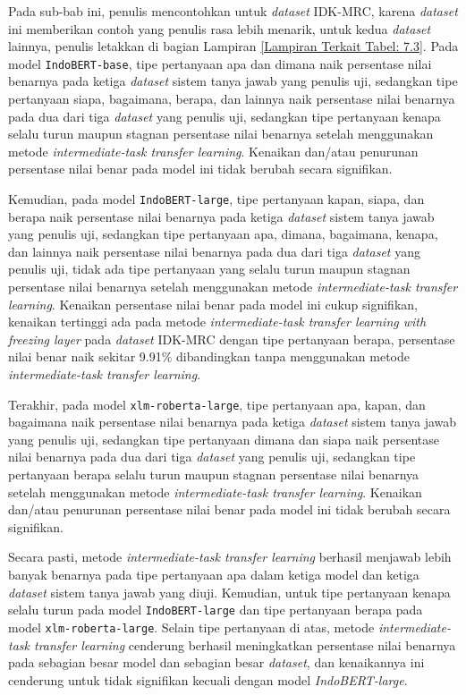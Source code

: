 Pada sub-bab ini, penulis mencontohkan untuk \emph{dataset} IDK-MRC, karena \emph{dataset} ini memberikan contoh yang penulis rasa lebih menarik, untuk kedua \emph{dataset} lainnya, penulis letakkan di bagian Lampiran \ref{Lampiran Terkait Tabel: 7.3}. Pada model \texttt{IndoBERT-base}, tipe pertanyaan apa dan dimana naik persentase nilai benarnya pada ketiga \emph{dataset} sistem tanya jawab yang penulis uji, sedangkan tipe pertanyaan siapa, bagaimana, berapa, dan lainnya naik persentase nilai benarnya pada dua dari tiga \emph{dataset} yang penulis uji, sedangkan tipe pertanyaan kenapa selalu turun maupun stagnan persentase nilai benarnya setelah menggunakan metode \emph{intermediate-task transfer learning}. Kenaikan dan/atau penurunan persentase nilai benar pada model ini tidak berubah secara signifikan.

Kemudian, pada model \texttt{IndoBERT-large}, tipe pertanyaan kapan, siapa, dan berapa naik persentase nilai benarnya pada ketiga \emph{dataset} sistem tanya jawab yang penulis uji, sedangkan tipe pertanyaan apa, dimana, bagaimana, kenapa, dan lainnya naik persentase nilai benarnya pada dua dari tiga \emph{dataset} yang penulis uji, tidak ada tipe pertanyaan yang selalu turun maupun stagnan persentase nilai benarnya setelah menggunakan metode \emph{intermediate-task transfer learning}. Kenaikan persentase nilai benar pada model ini cukup signifikan, kenaikan tertinggi ada pada metode \emph{intermediate-task transfer learning with freezing layer} pada \emph{dataset} IDK-MRC dengan tipe pertanyaan berapa, persentase nilai benar naik sekitar 9.91\% dibandingkan tanpa menggunakan metode \emph{intermediate-task transfer learning}.

Terakhir, pada model \texttt{xlm-roberta-large}, tipe pertanyaan apa, kapan, dan bagaimana naik persentase nilai benarnya pada ketiga \emph{dataset} sistem tanya jawab yang penulis uji, sedangkan tipe pertanyaan dimana dan siapa naik persentase nilai benarnya pada dua dari tiga \emph{dataset} yang penulis uji, sedangkan tipe pertanyaan berapa selalu turun maupun stagnan persentase nilai benarnya setelah menggunakan metode \emph{intermediate-task transfer learning}. Kenaikan dan/atau penurunan persentase nilai benar pada model ini tidak berubah secara signifikan.

Secara pasti, metode \emph{intermediate-task transfer learning} berhasil menjawab lebih banyak benarnya pada tipe pertanyaan apa dalam ketiga model dan ketiga \emph{dataset} sistem tanya jawab yang diuji. Kemudian, untuk tipe pertanyaan kenapa selalu turun pada model \texttt{IndoBERT-large} dan tipe pertanyaan berapa pada model \texttt{xlm-roberta-large}. Selain tipe pertanyaan di atas, metode \emph{intermediate-task transfer learning} cenderung berhasil meningkatkan persentase nilai benarnya pada sebagian besar model dan sebagian besar \emph{dataset}, dan kenaikannya ini cenderung untuk tidak signifikan kecuali dengan model \emph{IndoBERT-large}. 

